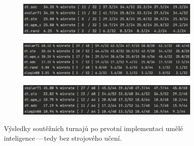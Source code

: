 \documentclass[11pt, a4paper]{article}
\theoremstyle{definition}
\begin{document}
\begin{figure}[H]
    \centering
    \begin{subfigure}{\textwidth}
        \centering
        \includegraphics[width=\linewidth]{tournament-1.png}
        \vspace{0mm}
    \end{subfigure}
    \begin{subfigure}{\textwidth}
        \centering        
        \includegraphics[width=\linewidth]{tournament-3.png}
        \vspace{0mm}
    \end{subfigure}
    \begin{subfigure}{\textwidth}
        \centering
        \includegraphics[width=\linewidth]{tournament-2.png}
    \end{subfigure}
    \caption{Výsledky soutěžních turnajů po prvotní implementaci umělé inteligence\,---\,tedy bez strojového učení.}
    \label{fig:vysledky-turnaje-bez-modelu}
\end{figure}
\end{document}
